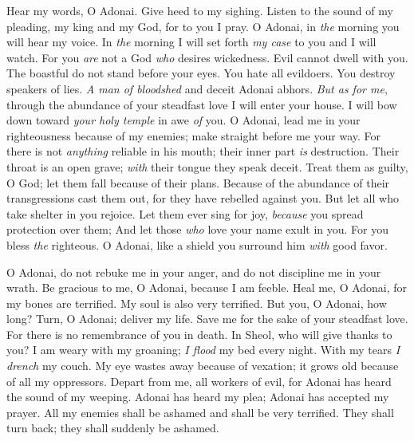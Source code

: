 \begin{biblechapter} %
 Hear my words, O Adonai. 
Give heed to my sighing.
\verse Listen to the sound of my pleading, my king and my God, 
for to you I pray.
\verse O Adonai, in \textit{the} morning you will hear my voice. 
In \textit{the} morning I will set forth \textit{my case} to you and I will watch.
\verse For you \textit{are} not a God \textit{who} desires wickedness. 
Evil cannot dwell with you.
\verse The boastful do not stand before your eyes. 
You hate all evildoers.
\verse You destroy speakers of lies. 
\textit{A man of bloodshed} and deceit Adonai abhors.
\verse \textit{But as for me}, through the abundance of your steadfast love 
I will enter your house. 
I will bow down toward \textit{your holy temple} in awe \textit{of} you.
\verse O Adonai, lead me in your righteousness because of my enemies; 
make straight before me your way.
\verse For there is not \textit{anything} reliable in his mouth; 
their inner part \textit{is} destruction. 
Their throat is an open grave; 
\textit{with} their tongue they speak deceit.
\verse Treat them as guilty, O God; 
let them fall because of their plans. 
Because of the abundance of their transgressions cast them out, 
for they have rebelled against you.
\verse But let all who take shelter in you rejoice. 
Let them ever sing for joy, 
\textit{because} you spread protection over them; 
And let those \textit{who} love your name exult in you.
\verse For you bless \textit{the} righteous. 
O Adonai, like a shield you surround him \textit{with} good favor.
\end{biblechapter}

\begin{biblechapter} %
 O Adonai, do not rebuke me in your anger, 
and do not discipline me in your wrath.
\verse Be gracious to me, O Adonai, because I am feeble. 
Heal me, O Adonai, for my bones are terrified.
\verse My soul is also very terrified. 
But you, O Adonai, how long?
\verse Turn, O Adonai; deliver my life. 
Save me for the sake of your steadfast love.
\verse For there is no remembrance of you in death. 
In Sheol, who will give thanks to you?
\verse I am weary with my groaning; 
\textit{I flood} my bed every night. 
With my tears \textit{I drench} my couch.
\verse My eye wastes away because of vexation; 
it grows old because of all my oppressors.
\verse Depart from me, all workers of evil, 
for Adonai has heard the sound of my weeping.
\verse Adonai has heard my plea; 
Adonai has accepted my prayer.
\verse All my enemies shall be ashamed and shall be very terrified. 
They shall turn back; they shall suddenly be ashamed.
\end{biblechapter}

